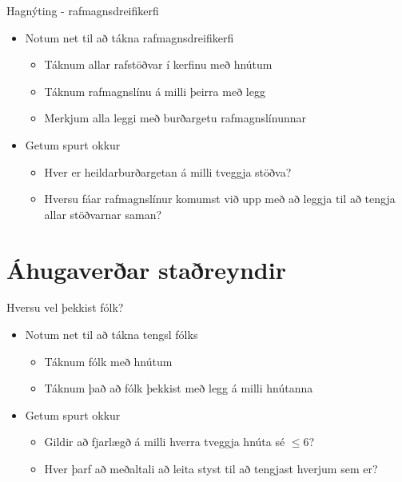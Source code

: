 \documentclass{beamer}
\begin{document}
\begin{frame}{Hagnýting - rafmagnsdreifikerfi}
\begin{itemize}
 \item Notum net til að tákna rafmagnsdreifikerfi
 \begin{itemize}
  \item Táknum allar rafstöðvar í kerfinu með hnútum
  \item Táknum rafmagnslínu á milli þeirra með legg
  \item Merkjum alla leggi með burðargetu rafmagnslínunnar
 \end{itemize}
 \item Getum spurt okkur
 \begin{itemize}
  \item Hver er heildarburðargetan á milli tveggja stöðva?
  \item Hversu fáar rafmagnslínur komumst við upp með að leggja til að tengja allar stöðvarnar saman?
 \end{itemize}
\end{itemize}
\end{frame}

\section{Áhugaverðar staðreyndir}

\begin{frame}{Hversu vel þekkist fólk?}
\begin{itemize}
 \item Notum net til að tákna tengsl fólks
 \begin{itemize}
  \item Táknum fólk með hnútum
  \item Táknum það að fólk þekkist með legg á milli hnútanna
 \end{itemize}
 \item Getum spurt okkur
 \begin{itemize}
  \item Gildir að fjarlægð á milli hverra tveggja hnúta sé $\leq 6$?
  \item Hver þarf að meðaltali að leita styst til að tengjast hverjum sem er?
 \end{itemize}
\end{itemize}
\end{frame}
\end{document}
